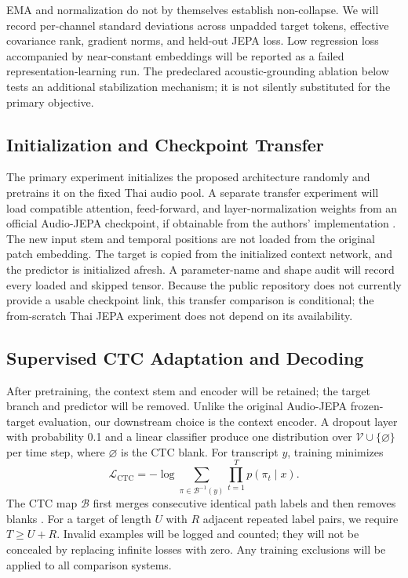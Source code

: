 EMA and normalization do not by themselves establish non-collapse. We will record per-channel standard deviations across unpadded target tokens, effective covariance rank, gradient norms, and held-out JEPA loss. Low regression loss accompanied by near-constant embeddings will be reported as a failed representation-learning run. The predeclared acoustic-grounding ablation below tests an additional stabilization mechanism; it is not silently substituted for the primary objective.

\subsection{Initialization and Checkpoint Transfer}
The primary experiment initializes the proposed architecture randomly and pretrains it on the fixed Thai audio pool. A separate transfer experiment will load compatible attention, feed-forward, and layer-normalization weights from an official Audio-JEPA checkpoint, if obtainable from the authors' implementation \cite{audiojepacode}. The new input stem and temporal positions are not loaded from the original patch embedding. The target is copied from the initialized context network, and the predictor is initialized afresh. A parameter-name and shape audit will record every loaded and skipped tensor. Because the public repository does not currently provide a usable checkpoint link, this transfer comparison is conditional; the from-scratch Thai JEPA experiment does not depend on its availability.

\subsection{Supervised CTC Adaptation and Decoding}
After pretraining, the context stem and encoder will be retained; the target branch and predictor will be removed. Unlike the original Audio-JEPA frozen-target evaluation, our downstream choice is the context encoder. A dropout layer with probability 0.1 and a linear classifier produce one distribution over $\mathcal{V}\cup\{\varnothing\}$ per time step, where $\varnothing$ is the CTC blank. For transcript $y$, training minimizes
\begin{equation}
\mathcal{L}_{\mathrm{CTC}}=-\log
\sum_{\pi\in\mathcal{B}^{-1}(y)}
\prod_{t=1}^{T}p(\pi_t\mid x).
\end{equation}
The CTC map $\mathcal{B}$ first merges consecutive identical path labels and then removes blanks \cite{graves2006ctc}. For a target of length $U$ with $R$ adjacent repeated label pairs, we require $T\ge U+R$. Invalid examples will be logged and counted; they will not be concealed by replacing infinite losses with zero. Any training exclusions will be applied to all comparison systems.

